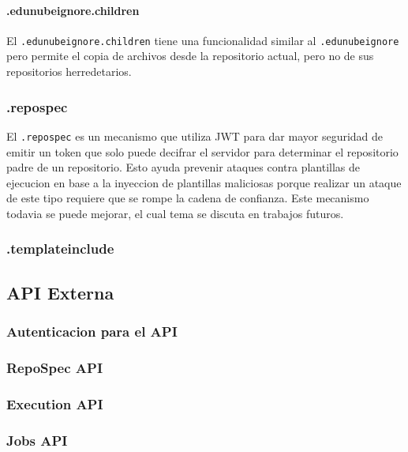 \paragraph{.edunubeignore.children}
El \texttt{.edunubeignore.children} tiene una funcionalidad similar al \texttt{.edunubeignore} pero permite el copia de archivos desde la repositorio actual, pero no de sus repositorios herredetarios.
\subsubsection{.repospec}
El \texttt{.repospec} es un mecanismo que utiliza JWT para dar mayor seguridad de emitir un token que solo puede decifrar el servidor para determinar el repositorio padre de un repositorio. Esto ayuda prevenir ataques contra plantillas de ejecucion en base a la inyeccion de plantillas maliciosas porque realizar un ataque de este tipo requiere que se rompe la cadena de confianza. Este mecanismo todavia se puede mejorar, el cual tema se discuta en trabajos futuros.
\subsubsection{.templateinclude}

\subsection{API Externa}
\subsubsection{Autenticacion para el API}
\subsubsection{RepoSpec API}
\subsubsection{Execution API}
\subsubsection{Jobs API}
